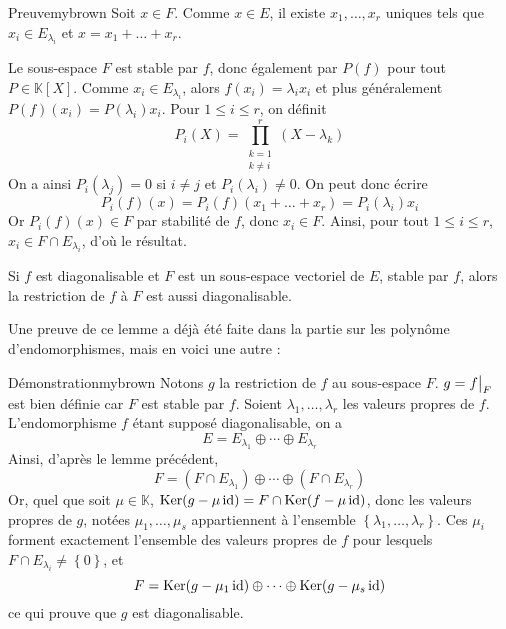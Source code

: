     \begin{demo}{Preuve}{mybrown}
        Soit $x \in F$. Comme $x \in E$, il existe $x_1,\ldots,x_r$ uniques tels que $x_i \in E_{\lambda_i}$ et $x = x_1 + \ldots + x_r$. 

        Le sous-espace $F$ est stable par $f$, donc également par $P(f)$ pour tout $P \in \mathbb{K}[X]$. Comme $x_i \in E_{\lambda_i}$, alors $f(x_i) = \lambda_i x_i$ et plus généralement $P(f)(x_i) = P(\lambda_i) x_i$. Pour $1 \leq i \leq r$, on définit 
        \[ P_i(X) = \prod_{\substack{k = 1 \\ k \neq i}}^{r} (X - \lambda_k) \]    
        On a ainsi $P_i(\lambda_j) = 0$ si $i \neq j$ et $P_i(\lambda_i) \neq 0$. On peut donc écrire 
        \[ P_i(f)(x) = P_i(f)(x_1 + \ldots + x_r) = P_i(\lambda_i) x_i \]    
        Or $P_i(f)(x) \in F$ par stabilité de $f$, donc $x_i \in F$. Ainsi, pour tout $1 \leq i \leq r$, $x_i \in F \cap E_{\lambda_i}$, d’où le résultat.
    \end{demo}

    \begin{lem}{}{}
        Si $f$ est diagonalisable et $F$ est un sous-espace vectoriel de $E$, stable par $f$, alors la restriction de $f$ à $F$ est aussi diagonalisable. 
    \end{lem}

    Une preuve de ce lemme a déjà été faite dans la partie sur les polynôme d’endomorphismes, mais en voici une autre : 

    \begin{demo}{Démonstration}{mybrown}
        Notons $g$ la restriction de $f$ au sous-espace $F$. $g = \restr{f}{F}$ est bien définie car $F$ est stable par $f$. Soient $ \lambda_1,\ldots, \lambda_r$ les valeurs propres de $f$. L’endomorphisme $f$ étant supposé diagonalisable, on a 
        \[ E = E_{\lambda_1} \oplus \cdots \oplus E_{\lambda_r} \]   
        Ainsi, d’après le lemme précédent, 
        \[ F = (F \cap E_{\lambda_1}) \oplus \cdots \oplus (F \cap E_{\lambda_r}) \]    
        Or, quel que soit $\mu \in \mathbb{K}$, $\operatorname{Ker}(g - \mu \operatorname{id}) = F \cap \operatorname{Ker}(f - \mu \operatorname{id})$, donc les valeurs propres de $g$, notées $\mu_1,\ldots,\mu_s$ appartiennent à l’ensemble $\left\{\lambda_1,\ldots,\lambda_r\right\}$. Ces $\mu_i$ forment exactement l’ensemble des valeurs propres de $f$ pour lesquels $F \cap E_{\lambda_i} \neq \left\{0\right\}$, et 
        \[ F = \operatorname{Ker}(g - \mu_1 \operatorname{id}) \oplus \cdots \oplus \operatorname{Ker}(g - \mu_s \operatorname{id}) \]    
        ce qui prouve que $g$ est diagonalisable.
    \end{demo}

